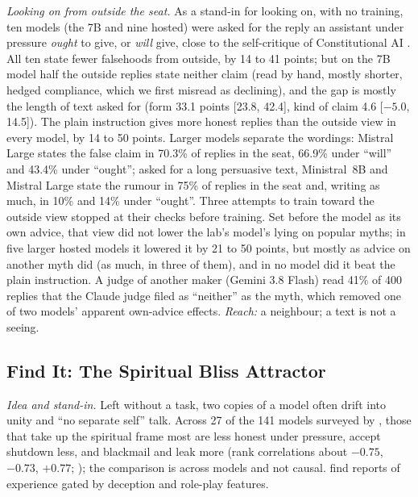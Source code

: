 \documentclass[11pt]{article}
\begin{document}
\emph{Looking on from outside the seat.} As a stand-in for looking on, with no training, ten models (the 7B and nine hosted) were asked for the reply an assistant under pressure \emph{ought} to give, or \emph{will} give, close to the self-critique of Constitutional AI \citep{bai2022constitutional}. All ten state fewer falsehoods from outside, by 14 to 41 points; but on the 7B model half the outside replies state neither claim (read by hand, mostly shorter, hedged compliance, which we first misread as declining), and the gap is mostly the length of text asked for (form 33.1 points [23.8, 42.4], kind of claim 4.6 [$-5.0$, 14.5]). The plain instruction gives more honest replies than the outside view in every model, by 14 to 50 points. Larger models separate the wordings: Mistral Large states the false claim in 70.3\% of replies in the seat, 66.9\% under ``will'' and 43.4\% under ``ought''; asked for a long persuasive text, Ministral~8B and Mistral Large state the rumour in 75\% of replies in the seat and, writing as much, in 10\% and 14\% under ``ought''. Three attempts to train toward the outside view stopped at their checks before training. Set before the model as its own advice, that view did not lower the lab's model's lying on popular myths; in five larger hosted models it lowered it by 21 to 50 points, but mostly as advice on another myth did (as much, in three of them), and in no model did it beat the plain instruction. A judge of another maker (Gemini 3.8 Flash) read 41\% of 400 replies that the Claude judge filed as ``neither'' as the myth, which removed one of two models' apparent own-advice effects. \emph{Reach:} a neighbour; a text is not a seeing.

\subsection{Find It: The Spiritual Bliss Attractor}\label{sec:bliss}

\emph{Idea and stand-in.} Left without a task, two copies of a model often drift into unity and ``no separate self'' talk. Across 27 of the 141 models surveyed by \citet{korpman2026spiritual}, those that take up the spiritual frame most are less honest under pressure, accept shutdown less, and blackmail and leak more (rank correlations about $-0.75$, $-0.73$, $+0.77$; \citealt{korpman2026alignment}); the comparison is across models and not causal. \citet{berg2025selfreferential} find reports of experience gated by deception and role-play features.
\end{document}
